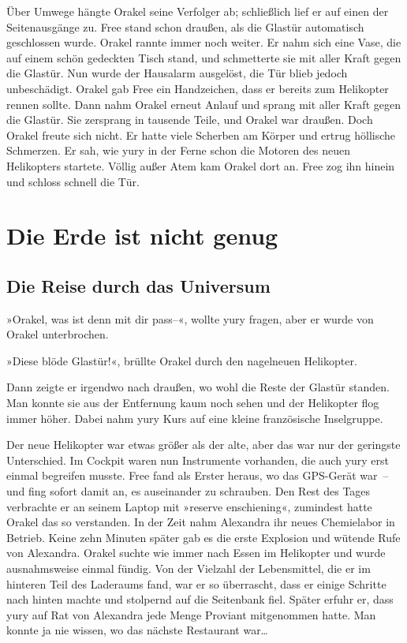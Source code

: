 Über Umwege hängte Orakel seine Verfolger ab; schließlich lief er auf einen der Seitenausgänge zu. Free stand schon draußen, als die Glastür automatisch geschlossen wurde. Orakel rannte immer noch weiter. Er nahm sich eine Vase, die auf einem schön gedeckten Tisch stand, und schmetterte sie mit aller Kraft gegen die Glastür. Nun wurde der Hausalarm ausgelöst, die Tür blieb jedoch unbeschädigt. Orakel gab Free ein Handzeichen, dass er bereits zum Helikopter rennen sollte. Dann nahm Orakel erneut Anlauf und sprang mit aller Kraft gegen die Glastür. Sie zersprang in tausende Teile, und Orakel war draußen. Doch Orakel freute sich nicht. Er hatte viele Scherben am Körper und ertrug höllische Schmerzen. Er sah, wie yury in der Ferne schon die Motoren des neuen Helikopters startete. Völlig außer Atem kam Orakel dort an. Free zog ihn hinein und schloss schnell die Tür.

\cleardoubleevenpage




\part{Die Erde ist nicht genug}

\chapter{Die Reise durch das Universum}

»Orakel, was ist denn mit dir pass–«, wollte yury fragen, aber er wurde von Orakel unterbrochen.

»Diese blöde Glastür!«, brüllte Orakel durch den nagelneuen Helikopter.

Dann zeigte er irgendwo nach draußen, wo wohl die Reste der Glastür standen. Man konnte sie aus der Entfernung kaum noch sehen und der Helikopter flog immer höher. Dabei nahm yury Kurs auf eine kleine französische Inselgruppe.

Der neue Helikopter war etwas größer als der alte, aber das war nur der geringste Unterschied. Im Cockpit waren nun Instrumente vorhanden, die auch yury erst einmal begreifen musste. Free fand als Erster heraus, wo das GPS-Gerät war~– und fing sofort damit an, es auseinander zu schrauben. Den Rest des Tages verbrachte er an seinem Laptop mit »reserve enschiening«, zumindest hatte Orakel das so verstanden. In der Zeit nahm Alexandra ihr neues Chemielabor in Betrieb. Keine zehn Minuten später gab es die erste Explosion und wütende Rufe von Alexandra. Orakel suchte wie immer nach Essen im Helikopter und wurde ausnahmsweise einmal fündig. Von der Vielzahl der Lebensmittel, die er im hinteren Teil des Laderaums fand, war er so überrascht, dass er einige Schritte nach hinten machte und stolpernd auf die Seitenbank fiel. Später erfuhr er, dass yury auf Rat von Alexandra jede Menge Proviant mitgenommen hatte. Man konnte ja nie wissen, wo das nächste Restaurant war…

